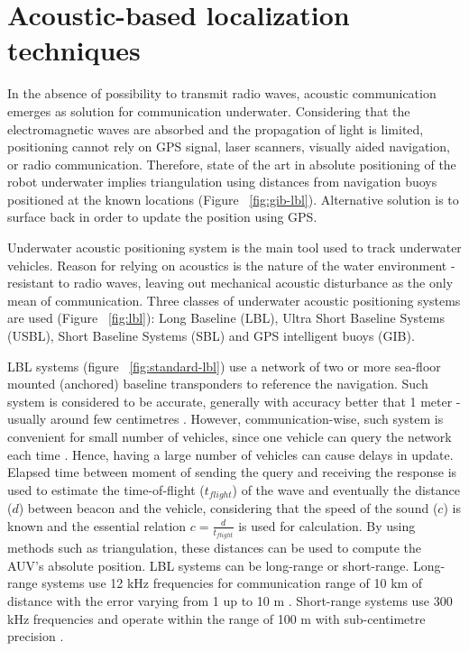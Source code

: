 \section{Acoustic-based localization techniques} \label{sec:acoustic}
In the absence of possibility to transmit radio waves, acoustic communication emerges as solution for communication underwater. Considering that the electromagnetic waves are absorbed and the propagation of light is limited, positioning cannot rely on GPS signal, laser scanners, visually aided navigation, or radio communication. Therefore, state of the art in absolute positioning of the robot underwater implies triangulation using distances from navigation buoys positioned at the known locations (Figure ~\ref{fig:gib-lbl}). Alternative solution is to surface back in order to update the position using GPS. 
 
Underwater acoustic positioning system is the main tool used to track underwater vehicles. Reason for relying on acoustics is the nature of the water environment - resistant to radio waves, leaving out mechanical acoustic disturbance as the only mean of communication. Three classes of underwater acoustic positioning systems are used (Figure ~\ref{fig:lbl}): Long Baseline (LBL), Ultra Short Baseline Systems (USBL), Short Baseline Systems (SBL) and GPS intelligent buoys (GIB). 

LBL systems (figure ~\ref{fig:standard-lbl}) use a network of two or more sea-floor mounted (anchored) baseline transponders to reference the navigation. Such system is considered to be accurate, generally with accuracy better that 1 meter - usually around few centimetres \cite{noaa01}. However, communication-wise, such system is convenient for small number of vehicles, since one vehicle can query the network each time \cite{bahr08}. Hence, having a large number of vehicles can cause delays in update. Elapsed time between moment of sending the query and receiving the response is used to estimate the time-of-flight ($t_{flight}$) of the wave and eventually the distance ($d$) between beacon and the vehicle, considering that the speed of the sound ($c$) is known and the essential relation $c = \frac{d}{t_{flight}}$ is used for calculation. By using methods such as triangulation, these distances can be used to compute the AUV's absolute position. LBL systems can be long-range or short-range. Long-range systems use 12 kHz frequencies for communication range of 10 km of distance with the error varying from 1 up to 10 m \cite{whitcomb99combined, bahr08}. Short-range systems use 300 kHz frequencies and operate within the range of 100 m with sub-centimetre precision \cite{whitcomb99combined, bahr08}. 
 
